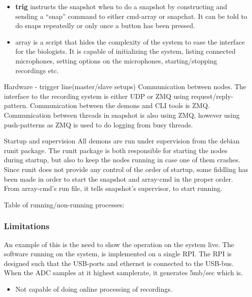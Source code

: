 \begin{itemize}
	
	\item \textbf{trig} instructs the snapshot when to do a snapshot by constructing and sending a “snap” command to either cmd-array or snapchat. It can be told to do snaps repeatedly or only once a button has been pressed.

	\item {array} is a script that hides the complexity of the system to ease the interface for the biologists. It is capable of initializing the system, listing connected microphones, setting options on the microphones, starting/stopping recordings etc.

\end{itemize}




Hardware - trigger line(master/slave setups)
Communication between nodes.
The interface to the recording system is either UDP or ZMQ using request/reply-pattern. Communication between the demons and CLI tools is ZMQ. Communication between threads in snapshot is also using ZMQ, however using push-patterns as ZMQ is used to do logging from busy threads.

Startup and supervision
All demons are run under supervision from the debian runit package. The runit package is both responsible for starting the nodes during startup, but also to keep the nodes running in case one of them crashes. Since runit does not provide any control of the order of startup, some fiddling has been made in order to start the snapshot and array-cmd in the proper order. From array-cmd’s run file, it tells snapshot’s supervisor, to start running.

Table of running/non-running processes:


 \label{sec:existingsystem:software:kernelmodule}


\subsubsection{Limitations} \label{sec:exisingsystem:limitations}
An example of this is the need to show the operation on the system live. 
The software running on the system, is implemented on a single RPI. The RPI is designed such that the USB-ports and ethernet is connected to the USB-bus. When the ADC samples at it highest samplerate, it generates 5mb/sec which is.

\begin{itemize}
	\item Not capable of doing online processing of recordings.
\end{itemize}

